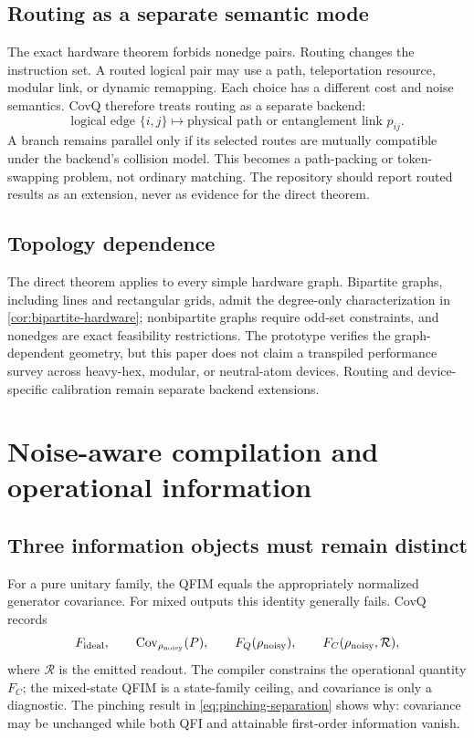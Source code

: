 \documentclass[11pt]{article}
\theoremstyle{definition}
\theoremstyle{remark}
\newcommand{\Cov}{\operatorname{Cov}}
\begin{document}
\subsection{Routing as a separate semantic mode}
The exact hardware theorem forbids nonedge pairs. Routing changes the instruction set. A routed logical pair may use a path, teleportation resource, modular link, or dynamic remapping. Each choice has a different cost and noise semantics. CovQ therefore treats routing as a separate backend:
\begin{equation}
  \text{logical edge }\{i,j\}
  \longmapsto
  \text{physical path or entanglement link }p_{ij}.
\end{equation}
A branch remains parallel only if its selected routes are mutually compatible under the backend's collision model. This becomes a path-packing or token-swapping problem, not ordinary matching. The repository should report routed results as an extension, never as evidence for the direct theorem.

\subsection{Topology dependence}
The direct theorem applies to every simple hardware graph. Bipartite graphs, including lines and rectangular grids, admit the degree-only characterization in \cref{cor:bipartite-hardware}; nonbipartite graphs require odd-set constraints, and nonedges are exact feasibility restrictions. The prototype verifies the graph-dependent geometry, but this paper does not claim a transpiled performance survey across heavy-hex, modular, or neutral-atom devices. Routing and device-specific calibration remain separate backend extensions.


\section{Noise-aware compilation and operational information}
\label{sec:noise}

\subsection{Three information objects must remain distinct}
For a pure unitary family, the QFIM equals the appropriately normalized generator covariance. For mixed outputs this identity generally fails. CovQ records
\begin{equation}
  F_{\rm ideal},\qquad
  \Cov_{\rho_{\rm noisy}}(P),\qquad
  F_Q(\rho_{\rm noisy}),\qquad
  F_C(\rho_{\rm noisy},\mathcal R),
  \label{eq:three-information-objects}
\end{equation}
where $\mathcal R$ is the emitted readout. The compiler constrains the operational quantity $F_C$; the mixed-state QFIM is a state-family ceiling, and covariance is only a diagnostic. The pinching result in \cref{eq:pinching-separation} shows why: covariance may be unchanged while both QFI and attainable first-order information vanish.
\end{document}
